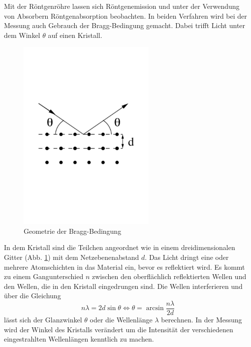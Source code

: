 Mit der Röntgenröhre lassen sich Röntgenemission und unter der Verwendung von Absorbern Röntgenabsorption beobachten.
In beiden Verfahren wird bei der Messung auch Gebrauch der Bragg-Bedingung gemacht.
Dabei trifft Licht unter dem Winkel $\theta$ auf einen Kristall.
\begin{figure}[h!]
  \centering
  \includegraphics[width=0.6\textwidth]{kristall.pdf}
  \caption{Geometrie der Bragg-Bedingung \cite{1}}
  \label{fig:kristall}
\end{figure}
In dem Kristall sind die Teilchen angeordnet wie in einem dreidimensionalen Gitter (Abb. \ref{fig:kristall}) mit dem Netzebenenabstand $d$.
Das Licht dringt eine oder mehrere Atomschichten in das Material ein, bevor es reflektiert wird.
Es kommt zu einem Gangunterschied $n$ zwischen den oberflächlich reflektierten Wellen und den Wellen, die in den Kristall eingedrungen sind.
Die Wellen interferieren und über die Gleichung
\begin{equation}
  n \lambda = 2 d \sin{\theta} \Leftrightarrow \theta = \arcsin{\frac{n \lambda}{2d}}
  \label{eqn:winkel}
\end{equation}
lässt sich der Glanzwinkel $\theta$ oder die Wellenlänge $\lambda$ berechnen.
In der Messung wird der Winkel des Kristalls verändert um die Intensität der verschiedenen eingestrahlten Wellenlängen kenntlich zu machen.
\FloatBarrier
